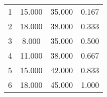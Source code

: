 % 
\begin{tabular}{cccc}
  \hline
  \hline
1 & 15.000 & 35.000 & 0.167 \\ 
  2 & 18.000 & 38.000 & 0.333 \\ 
  3 & 8.000 & 35.000 & 0.500 \\ 
  4 & 11.000 & 38.000 & 0.667 \\ 
  5 & 15.000 & 42.000 & 0.833 \\ 
  6 & 18.000 & 45.000 & 1.000 \\ 
   \hline
\end{tabular}
